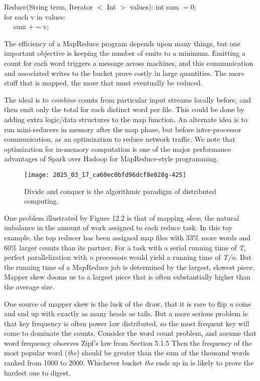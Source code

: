 \documentclass[10pt]{article}
\begin{document}
\begin{enumerate}
Reduce(String term, Iterator $<$ Int $>$ values): int sum $=0 ;$\\
for each v in values:\\
$\quad$ sum $+=\mathrm{v}$;

The efficiency of a MapReduce program depends upon many things, but one important objective is keeping the number of emits to a minimum. Emitting a count for each word triggers a message across machines, and this communication and associated writes to the bucket prove costly in large quantities. The more stuff that is mapped, the more that must eventually be reduced.

The ideal is to \textit{combine} counts from particular input streams locally before, and then emit only the total for each distinct word per file. This could be done by adding extra logic/data structures to the map function. An alternate idea is to run mini-reducers in memory after the map phase, but before inter-processor communication, as an optimization to reduce network traffic. We note that optimization for in-memory computation is one of the major performance advantages of Spark over Hadoop for MapReduce-style programming.

\begin{figure}[ht]
    \centering
    \texttt{[image: 2025\_03\_17\_ca60ec0bfd96dcf8e028g-425]}
    \caption{Divide and conquer is the algorithmic paradigm of distributed computing.}
\end{figure}

One problem illustrated by Figure 12.2 is that of mapping \textit{skew}, the natural imbalance in the amount of work assigned to each reduce task. In this toy example, the top reducer has been assigned map files with $33\%$ more words and $60\%$ larger counts than its partner. For a task with a serial running time of \textit{T}, perfect parallelization with \textit{n} processors would yield a running time of \textit{T/n}. But the running time of a MapReduce job is determined by the largest, slowest piece. Mapper skew dooms us to a largest piece that is often substantially higher than the average size.

One source of mapper skew is the luck of the draw, that it is rare to flip \textit{n} coins and end up with exactly as many heads as tails. But a more serious problem is that key frequency is often power law distributed, so the most frequent key will come to dominate the counts. Consider the word count problem, and assume that word frequency observes Zipf's law from Section 5.1.5 Then the frequency of the most popular word (\textit{the}) should be greater than the sum of the thousand words ranked from 1000 to 2000. Whichever bucket \textit{the} ends up in is likely to prove the hardest one to digest.\footnotemark


\end{enumerate}
\end{document}
